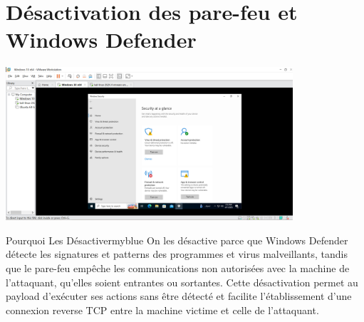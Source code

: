 \section{Désactivation des pare-feu et Windows Defender}

\begin{center}
    \includegraphics[width=0.8\textwidth]{Question/SC/2-sec.PNG}
\end{center}

\vspace{0.35cm}

\begin{prettyBox}{Pourquoi Les Désactiver}{myblue}
On les désactive parce que Windows Defender détecte les signatures et patterns 
des programmes et virus malveillants, tandis que le pare-feu empêche les communications
non autorisées avec la machine de l'attaquant, qu'elles soient entrantes ou sortantes.
Cette désactivation permet au payload d'exécuter ses actions sans être détecté et
facilite l'établissement d'une connexion reverse TCP entre la machine victime et celle de l'attaquant.
\end{prettyBox}

